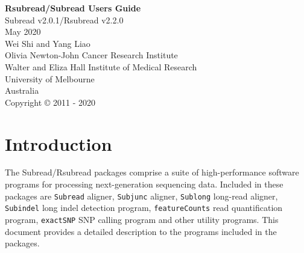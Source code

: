 \documentclass[12pt]{report}
\newcommand{\code}[1]{{\small\texttt{#1}}}
\begin{document}
\begin{titlepage}

\begin{center}
{\Huge\bf Rsubread/Subread Users Guide}\\
\vspace{1 cm}
{\centering\large Subread v2.0.1/Rsubread v2.2.0\\}
\vspace{1 cm}
 May 2020\\
\vspace{5 cm}
\Large Wei Shi and Yang Liao\\
\vspace{1 cm}
\small
{\large Olivia Newton-John Cancer Research Institute\\
Walter and Eliza Hall Institute of Medical Research\\
University of Melbourne\\
Australia\\}
\vspace{7 cm}
\centering Copyright \small{\copyright}  2011 - 2020\\
\end{center}

\end{titlepage}

\tableofcontents

\chapter{Introduction}

The Subread/Rsubread packages comprise a suite of high-performance software programs for processing next-generation sequencing data.
Included in these packages are \code{Subread} aligner, \code{Subjunc} aligner, \code{Sublong} long-read aligner, \code{Subindel} long indel detection program, \code{featureCounts} read quantification program, \code{exactSNP} SNP calling program and other utility programs.
This document provides a detailed description to the programs included in the packages.
\end{document}

